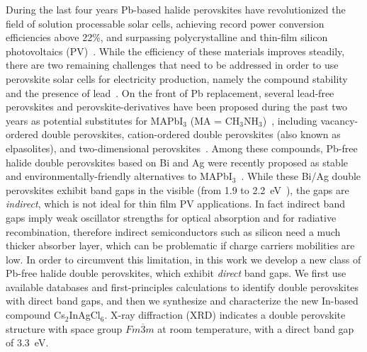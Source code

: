 \documentclass[journal=jpcl,manuscript=letter,layout=traditional]{achemso}
\begin{document}
During the last four years Pb-based halide perovskites have revolutionized the field of solution processable
solar cells, achieving record power conversion efficiencies above 22\%, and surpassing
polycrystalline and thin-film silicon photovoltaics (PV)~\cite{Xing2013,Stranks2013,
Seo2016,Eperon2016}. While
the efficiency of these materials improves steadily, there are two remaining challenges that need to
be addressed in order to use perovskite solar cells for electricity production, namely the compound
stability and the presence of lead~\cite{Green2014}. On the front of Pb replacement,
several lead-free perovskites and perovskite-derivatives have been proposed during the past two years
as potential substitutes for MAPbI$_3$ (MA = CH$_3$NH$_3$)~\cite{Giustino2016}, including vacancy-ordered double perovskites,
cation-ordered double perovskites (also known as elpasolites), and two-dimensional perovskites~\cite{Stoumpos2013,Noel2014,
Saparov2015,Kim2016,Xiao2016,Volonakis2016,Slavney2016,McClure2016,Filip2016b,Milot2016,Kaltzoglou2016}.
Among these compounds, Pb-free halide double perovskites based on Bi and Ag were recently proposed as stable and
environmentally-friendly alternatives to MAPbI$_3$~\cite{Volonakis2016,Slavney2016,McClure2016,Filip2016b}. While these
Bi/Ag double perovskites exhibit band gaps in the visible (from 1.9 to 2.2~eV~\cite{Filip2016b}), the gaps are {\it indirect},
which is not ideal for thin film PV applications. In fact indirect band gaps imply weak oscillator strengths for
optical absorption and for radiative recombination, therefore indirect semiconductors such as silicon need a much thicker absorber
layer, which can be problematic if charge carriers mobilities are low.
In order to circumvent this limitation, in this work we develop a new class of Pb-free halide double
perovskites, which exhibit {\it direct} band gaps. We first use available databases and
first-principles calculations to identify double perovskites with direct band gaps, and then we
synthesize and characterize the new In-based compound Cs$_2$InAgCl$_6$. X-ray diffraction (XRD) indicates
a double perovskite structure with space group $Fm\overline{3}m$ at room temperature, with a direct
band gap of 3.3~eV.
\end{document}
